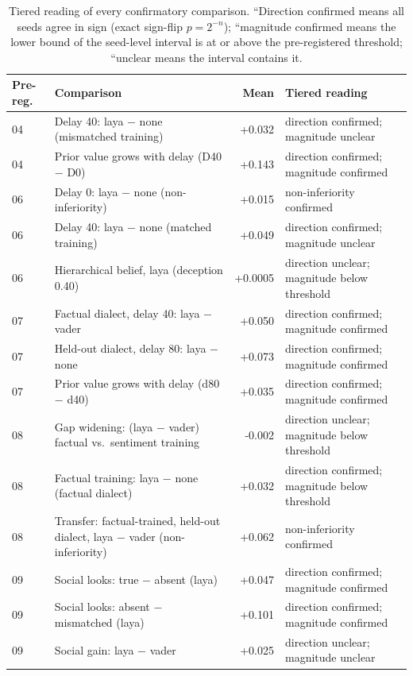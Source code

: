 \begin{table}[t]\centering\small\caption{Tiered reading of every confirmatory comparison. ``Direction confirmed means all seeds agree in sign (exact sign-flip $p=2^{-n}$); ``magnitude confirmed means the lower bound of the seed-level interval is at or above the pre-registered threshold; ``unclear means the interval contains it.}\label{tab:tiers}
\begin{tabular}{@{}lp{}rp{}@{}}\toprule
Pre-reg. & Comparison & Mean & Tiered reading \\\midrule
04 & Delay 40: laya $-$ none (mismatched training) & +0.032 & direction confirmed; magnitude unclear \\
04 & Prior value grows with delay (D40 $-$ D0) & +0.143 & direction confirmed; magnitude confirmed \\
06 & Delay 0: laya $-$ none (non-inferiority) & +0.015 & non-inferiority confirmed \\
06 & Delay 40: laya $-$ none (matched training) & +0.049 & direction confirmed; magnitude unclear \\
06 & Hierarchical belief, laya (deception 0.40) & +0.0005 & direction unclear; magnitude below threshold \\
07 & Factual dialect, delay 40: laya $-$ vader & +0.050 & direction confirmed; magnitude confirmed \\
07 & Held-out dialect, delay 80: laya $-$ none & +0.073 & direction confirmed; magnitude confirmed \\
07 & Prior value grows with delay (d80 $-$ d40) & +0.035 & direction confirmed; magnitude confirmed \\
08 & Gap widening: (laya $-$ vader) factual vs.\ sentiment training & -0.002 & direction unclear; magnitude below threshold \\
08 & Factual training: laya $-$ none (factual dialect) & +0.032 & direction confirmed; magnitude below threshold \\
08 & Transfer: factual-trained, held-out dialect, laya $-$ vader (non-inferiority) & +0.062 & non-inferiority confirmed \\
09 & Social looks: true $-$ absent (laya) & +0.047 & direction confirmed; magnitude confirmed \\
09 & Social looks: absent $-$ mismatched (laya) & +0.101 & direction confirmed; magnitude confirmed \\
09 & Social gain: laya $-$ vader & +0.025 & direction unclear; magnitude unclear \\

\end{tabular}
\end{table}
